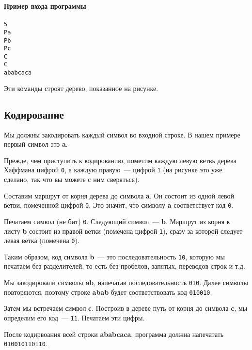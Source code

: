 ﻿\documentclass[a4paper,10pt]{article}
\begin{document}
\noindent\textbf{Пример входа программы}\\
\texttt{ \\
5\\
Pa\\
Pb\\
Pc\\
C\\
C\\
ababcaca
}

Эти команды строят дерево, показанное на рисунке.

\subsection*{Кодирование}

Мы должны закодировать каждый символ во входной строке.
В нашем примере первый символ это \textbf{a}.

Прежде, чем приступить к кодированию, пометим каждую левую ветвь дерева Хаффмана цифрой \texttt{0}, а каждую правую~--- цифрой \texttt{1} (на рисунке это уже сделано, так что вы можете с ним сверяться).

Составим маршрут от корня дерева до символа \textbf{a}.
Он состоит из одной левой ветви, помеченной цифрой \texttt{0}.
Это значит, что символу \textbf{a} соответствует код \texttt{0}.

Печатаем символ (не бит) \texttt{0}.
Следующий символ~--- \textbf{b}. Маршрут из корня к листу \textbf{b} состоит из правой ветки (помечена цифрой \texttt{1}), сразу за которой следует левая ветка (помечена \texttt{0}).

Таким образом, код символа \textbf{b}~--- это последовательность \texttt{10}, которую мы печатаем без разделителей, то есть без пробелов, запятых, переводов строк и т.д.

Мы закодировали символы \textbf{ab}, напечатав последовательность \texttt{010}.
Далее символы повторяются, поэтому строке \textbf{abab} будет соответствовать код \texttt{010010}.

Затем мы встречаем символ \textbf{c}.
Построив в дереве путь от корня до символа \textbf{c}, мы определим его код~--- \texttt{11}.
Печатаем эти цифры.

После кодирвоания всей строки \textbf{ababcaca}, программа должна напечатать \texttt{010010110110}.
\end{document}
